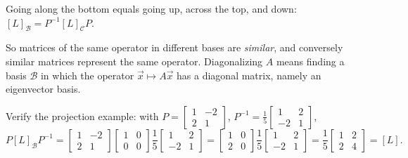\begin{center}
\end{center}
Going along the bottom equals going up, across the top, and down: $[L]_{\mathcal B}=P^{-1}[L]_{\mathcal C}P$.

So matrices of the same operator in different bases are \emph{similar}, and conversely similar matrices represent
the same operator. Diagonalizing $A$ means finding a basis $\mathcal B$ in which the operator $\vec x\mapsto A\vec x$ has a
diagonal matrix, namely an eigenvector basis.

\begin{example}
Verify the projection example: with $P=\begin{bmatrix}1&-2\\2&1\end{bmatrix}$, $P^{-1}=\frac15\begin{bmatrix}1&2\\-2&1\end{bmatrix}$,
\[
P[L]_{\mathcal B}P^{-1}=\begin{bmatrix}1&-2\\2&1\end{bmatrix}\begin{bmatrix}1&0\\0&0\end{bmatrix}\frac15\begin{bmatrix}1&2\\-2&1\end{bmatrix}
=\begin{bmatrix}1&0\\2&0\end{bmatrix}\frac15\begin{bmatrix}1&2\\-2&1\end{bmatrix}=\frac15\begin{bmatrix}1&2\\2&4\end{bmatrix}=[L].
\]
\end{example}

